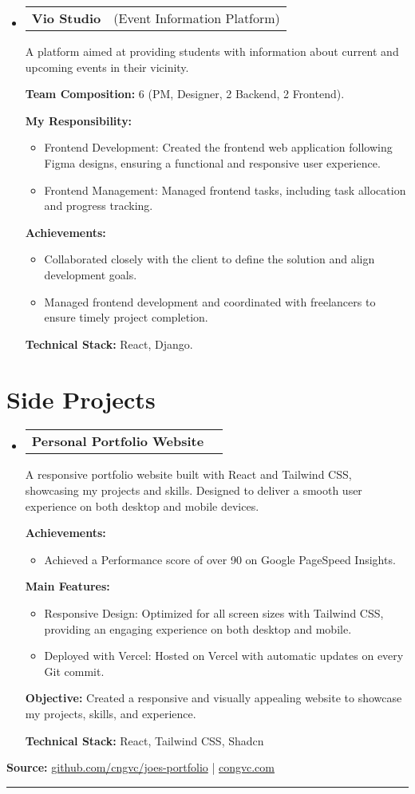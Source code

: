 \documentclass[letterpaper,11pt]{article}
\makeatletter
\newcommand{\resumeProjectTitle}[2]{
  \vspace{-2pt}\item
    \begin{tabular*}{1\textwidth}[t]{l @{\hskip 2pt} r}
      \textbf{#1} & \small #2 \\
    \end{tabular*}\vspace{2pt}
}
\newcommand{\resumeDesc}[1]{
  {#1\\ \vspace{0px}}
}
\newcommand{\resumeItem}[1]{
  \item{#1 \vspace{-2pt}}
}
\newcommand{\resumeItemListTitle}[1]{%
  \vspace{4pt} \textbf{#1} \vspace{-2pt}%
}
\newcommand{\resumeItemListStart}{\vspace{-4pt}\begin{itemize}[leftmargin=12px]}
\newcommand{\resumeItemListEnd}{\end{itemize}\vspace{-5pt}}
\newcommand{\resumeSubHeadingListStart}{\begin{itemize}[leftmargin=0pt, label={}]}
\newcommand{\resumeSubHeadingListEnd}{\end{itemize}\vspace{-5pt}}
\makeatother
\begin{document}
\resumeSubHeadingListStart
\resumeProjectTitle{Vio Studio}{(Event Information Platform)}
\resumeDesc{A platform aimed at providing students with information about current and upcoming events in their vicinity.}
\resumeItemListTitle{Team Composition:} 6 (PM, Designer, 2 Backend, 2 Frontend).
\par
\resumeItemListTitle{My Responsibility:}
\resumeItemListStart
    \resumeItem{Frontend Development: Created the frontend web application following Figma designs, ensuring a functional and responsive user experience.}
    \resumeItem{Frontend Management: Managed frontend tasks, including task allocation and progress tracking.}
\resumeItemListEnd
\resumeItemListTitle{Achievements:}
\resumeItemListStart
    \resumeItem{Collaborated closely with the client to define the solution and align development goals.}
    \resumeItem{Managed frontend development and coordinated with freelancers to ensure timely project completion.}
\resumeItemListEnd
\resumeItemListTitle{Technical Stack:} React, Django.
\resumeSubHeadingListEnd


\section{Side Projects}
\resumeSubHeadingListStart
\resumeProjectTitle{Personal Portfolio Website}{}
\resumeDesc{A responsive portfolio website built with React and Tailwind CSS, showcasing my projects and skills. Designed to deliver a smooth user experience on both desktop and mobile devices.}
\resumeItemListTitle{Achievements:}
\resumeItemListStart
    \resumeItem{Achieved a Performance score of over 90 on Google PageSpeed Insights.}
\resumeItemListEnd
\resumeItemListTitle{Main Features:}
\resumeItemListStart
    \resumeItem{Responsive Design: Optimized for all screen sizes with Tailwind CSS, providing an engaging experience on both desktop and mobile.}
    \resumeItem{Deployed with Vercel: Hosted on Vercel with automatic updates on every Git commit.}
\resumeItemListEnd
\resumeItemListTitle{Objective:} Created a responsive and visually appealing website to showcase my projects, skills, and experience.
\par
\resumeItemListTitle{Technical Stack:} React, Tailwind CSS, Shadcn
\resumeSubHeadingListEnd
\noindent\textbf{Source:} \url{github.com/cngvc/joes-portfolio} | \url{congvc.com}
\noindent\rule{\textwidth}{0.4pt}
\end{document}

